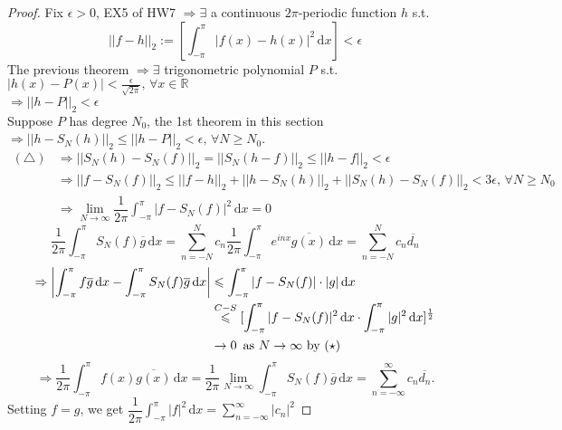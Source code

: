     \begin{proof}
        Fix  $ \epsilon>0 $, EX5 of HW7 $ \Rightarrow\exists  $ a continuous  $ 2\pi $-periodic function  $ h  $ s.t.
        \[||f-h||_2:=[\int_{-\pi }^{\pi } |f(x)-h(x)|^2\, \mathrm{d}x  ]<\epsilon\] 
        The previous theorem  $ \Rightarrow \exists  $ trigonometric polynomial  $ P  $ s.t. $ |h(x)-P(x)|<\frac{\epsilon}{\sqrt{2\pi }},\,\forall x\in\mathbb{R } $\\
         $ \Rightarrow||h-P||_2<\epsilon $\\
         Suppose  $ P  $ has degree  $ N_0  $, the 1st theorem in this section  $ \Rightarrow ||h-S_N(h)||_2 \leqslant ||h-P||_2<\epsilon,\,\forall N\geqslant N_0 $.\\
          \begin{align*}
            (\triangle)&\Rightarrow ||S_N(h)-S_N(f)||_2=||S_N(h-f)||_2 \leqslant ||h-f||_2<\epsilon\\
             &\Rightarrow ||f-S_N(f)||_2 \leqslant ||f-h||_2+||h-S_N(h)||_2+||S_N(h)-S_N(f)||_2<3\epsilon,\,\forall N\geqslant N_0\\
             &\Rightarrow \lim\limits_{N\to\infty} \dfrac{1 }{2\pi}\int_{-\pi }^{\pi } |f-S_N(f)|^2\, \mathrm{d}x=0 \tag{ $ \star  $ }   
          \end{align*} 
          \[
            \dfrac{1 }{2\pi }\int_{-\pi }^{\pi } S_N(f)\overline{g }\, \mathrm{d}x=\sum\limits_{n=-N }^{N } c_n\dfrac{1 }{2\pi }\int_{-\pi }^{\pi } e^{inx }\overline{g(x)} \, \mathrm{d}x=\sum\limits_{n=-N }^{N } c_n\overline{d_n}   
          \]   
          \begin{align*}
            \Rightarrow \left|\int_{-\pi }^{\pi } f\overline{g }\, \mathrm{d}x- \int_{-\pi }^{\pi } S_N(f)\overline{g }\, \mathrm{d}x\right| & \leqslant \int_{-\pi }^{\pi } |f-S_N(f)|\cdot|g|\, \mathrm{d}x \\
            &\overset{C-S}{ \leqslant } [\int_{-\pi }^{\pi } |f-S_N(f)|^2\, \mathrm{d}x \cdot \int_{-\pi }^{\pi } |g|^2\, \mathrm{d}x  ]^{\frac{1 }{2}}\\
            &\rightarrow0\,\text{ as  $ N\to\infty  $  by ($ \star $)}
          \end{align*}
          \[
            \Rightarrow \dfrac{1 }{2\pi }\int_{-\pi }^{\pi } f(x)\overline{g(x)}\, \mathrm{d}x=\dfrac{1 }{2\pi }\lim\limits_{N\to\infty} \int_{-\pi }^{\pi } S_N(f)\overline{g }\, \mathrm{d}x =\sum\limits_{n=-\infty }^{\infty} c_n\overline{d_n }.\]
            Setting  $ f=g $, we get  $ \dfrac{1}{2\pi }\int_{-\pi }^{\pi } |f|^2\, \mathrm{d}x=\sum\limits_{n=-\infty }^{\infty} |c_n|^2   $       
    \end{proof}
